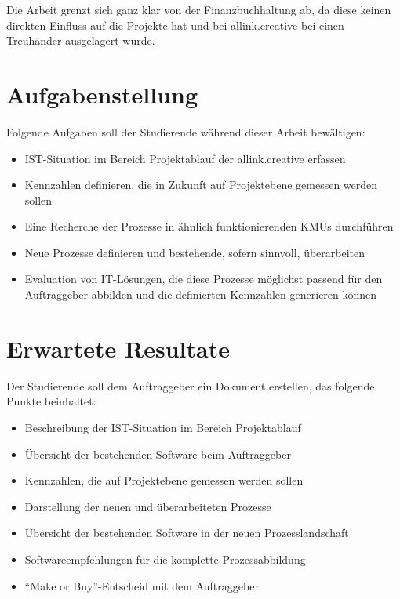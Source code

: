 \documentclass[]{scrreprt}
\begin{document}
    Die Arbeit grenzt sich ganz klar von der Finanzbuchhaltung ab, da
    diese keinen direkten Einfluss auf die Projekte hat und bei allink.creative 
    bei einen Treuhänder ausgelagert wurde.
    

    \section{Aufgabenstellung}
    Folgende Aufgaben soll der Studierende während dieser Arbeit bewältigen:
    
    \begin{itemize}
        \item IST-Situation im Bereich Projektablauf der allink.creative erfassen
        \item Kennzahlen definieren, die in Zukunft auf Projektebene gemessen 
            werden sollen
        \item Eine Recherche der Prozesse in ähnlich funktionierenden KMUs durchführen
        \item Neue Prozesse definieren und bestehende, sofern sinnvoll, überarbeiten
        \item Evaluation von IT-Lösungen, die diese Prozesse möglichst passend 
            für den Auftraggeber abbilden und die definierten Kennzahlen generieren können
    \end{itemize}

    \section{Erwartete Resultate}
    Der Studierende soll dem Auftraggeber ein Dokument erstellen, das folgende 
    Punkte beinhaltet: 
    
    \begin{itemize}
        \item Beschreibung der IST-Situation im Bereich Projektablauf
        \item Übersicht der bestehenden Software beim Auftraggeber
        \item Kennzahlen, die auf Projektebene gemessen werden sollen
        \item Darstellung der neuen und überarbeiteten Prozesse
        \item Übersicht der bestehenden Software in der neuen Prozesslandschaft
        \item Softwareempfehlungen für die komplette Prozessabbildung
        \item ``Make or Buy''-Entscheid mit dem Auftraggeber
    \end{itemize}
    
\end{document}
